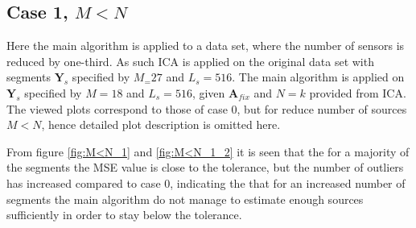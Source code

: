 \subsection{Case 1, $M<N$}
Here the main algorithm is applied to a data set, where the number of sensors is reduced by one-third. As such ICA is applied on the original data set with segments $\textbf{Y}_s$ specified by $M_= 27$ and $L_s = 516$. The main algorithm is applied on $\textbf{Y}_s$ specified by $M=18$ and $L_s=516$, given $\textbf{A}_{fix}$ and $N = k$ provided from ICA.  
The viewed plots correspond to those of case 0, but for reduce number of sources $M<N$, hence detailed plot description is omitted here.   

From figure \ref{fig:M<N_1} and \ref{fig:M<N_1_2} it is seen that the for a majority of the segments the MSE value is close to the tolerance, but the number of outliers has increased compared to case 0, indicating the that for an increased number of segments the main algorithm do not manage to estimate enough  sources sufficiently in order to stay below the tolerance.   
